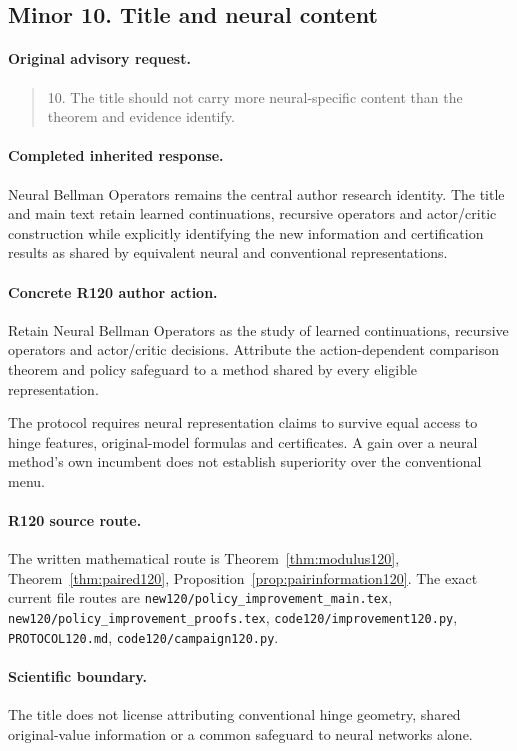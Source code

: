 \subsection{Minor 10. Title and neural content}
\label{response120:minor-10}
\paragraph{Original advisory request.}
\begin{quote}
10. The title should not carry more neural-specific content than the theorem and evidence identify.
\end{quote}
\paragraph{Completed inherited response.}
Neural Bellman Operators remains the central author research identity. The title and main text retain learned continuations, recursive operators and actor/critic construction while explicitly identifying the new information and certification results as shared by equivalent neural and conventional representations.
\paragraph{Concrete R120 author action.}
Retain Neural Bellman Operators as the study of learned continuations, recursive operators and actor/critic decisions. Attribute the action-dependent comparison theorem and policy safeguard to a method shared by every eligible representation.

The protocol requires neural representation claims to survive equal access to hinge features, original-model formulas and certificates. A gain over a neural method's own incumbent does not establish superiority over the conventional menu.
\paragraph{R120 source route.}
The written mathematical route is Theorem~\ref{thm:modulus120}, Theorem~\ref{thm:paired120}, Proposition~\ref{prop:pairinformation120}. The exact current file routes are \nolinkurl{new120/policy_improvement_main.tex}, \nolinkurl{new120/policy_improvement_proofs.tex}, \nolinkurl{code120/improvement120.py}, \nolinkurl{PROTOCOL120.md}, \nolinkurl{code120/campaign120.py}.
\paragraph{Scientific boundary.}
The title does not license attributing conventional hinge geometry, shared original-value information or a common safeguard to neural networks alone.

